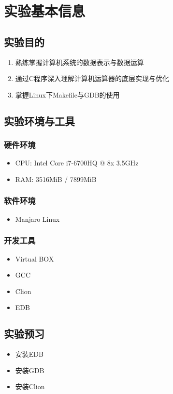 \section{实验基本信息}

\subsection{实验目的}
\begin{enumerate}
    \item 熟练掌握计算机系统的数据表示与数据运算
    \item 通过C程序深入理解计算机运算器的底层实现与优化
    \item 掌握Linux下Makefile与GDB的使用
\end{enumerate}

\subsection{实验环境与工具}

\subsubsection{硬件环境}
\begin{itemize}
    \item CPU: Intel Core i7-6700HQ @ 8x 3.5GHz
    \item RAM: 3516MiB / 7899MiB
\end{itemize}

\subsubsection{软件环境}
\begin{itemize}
    \item Manjaro Linux

\end{itemize}

\subsubsection{开发工具}
\begin{itemize}
    \item Virtual BOX
    \item GCC
    \item Clion
    \item EDB
\end{itemize}

\subsection{实验预习}
\begin{itemize}
    \item 安装EDB
    \item 安装GDB
    \item 安装Clion
\end{itemize}
